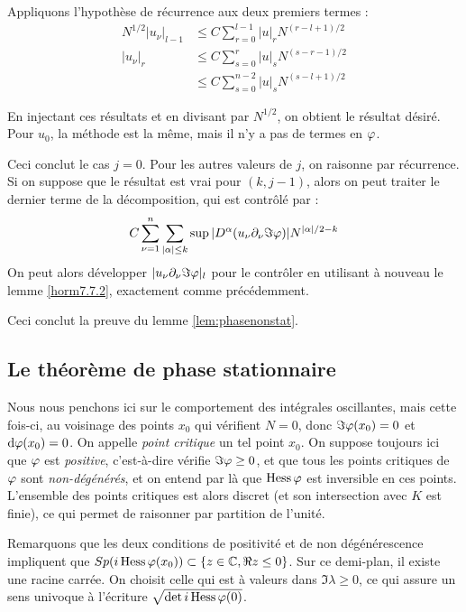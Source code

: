 \noindent Appliquons l'hypothèse de récurrence aux deux premiers termes :
\begin{align*}
N^{1/2}|u_{\nu}|_{l-1} &\leq C \sum_{r=0}^{l-1} |u|_r N^{(r-l+1)/2}\\
|u_{\nu}|_r & \leq C\sum_{s=0}^{r}|u|_sN^{(s-r-1)/2}\\
  &\leq C\sum_{s=0}^{n-2}|u|_sN^{(s-l+1)/2}
\end{align*}

\noindent En injectant ces résultats et en divisant par $N^{1/2}$, on obtient le résultat désiré. Pour $u_0$, la méthode est la même, mais il n'y a pas de termes en $\varphi$.

Ceci conclut le cas $j=0$. Pour les autres valeurs de $j$, on raisonne par récurrence. Si on suppose que le résultat est vrai pour $(k,j-1)$, alors on peut traiter le dernier terme de la décomposition, qui est contrôlé par :
\begin{equation*}
  C \sum_{\nu=1}^{n} \sum_{|\alpha| \leq
    k}\sup|D^{\alpha}(u_{\nu}\partial_{\nu}\Im \varphi)| N^{|\alpha|/2-k}
\end{equation*}
\noindent On peut alors développer $|u_{\nu}\partial_{\nu}\Im \varphi|_l$ pour le contrôler en utilisant à nouveau le lemme \ref{horm7.7.2}, exactement comme précédemment.

Ceci conclut la preuve du lemme \ref{lem:phasenonstat}.

\subsection{Le théorème de phase stationnaire}

Nous nous penchons ici sur le comportement des intégrales oscillantes,
mais cette fois-ci, au voisinage des points $x_0$ qui vérifient $N=0$,
donc $\Im \varphi(x_0) = 0$ et $\mathrm{d}\varphi(x_0)=0$. On appelle \emph{point
  critique} un tel point $x_0$. On suppose toujours ici que $\varphi$ est
\emph{positive}, c'est-à-dire vérifie $\Im \varphi \geq 0$, et que tous
les points critiques de $\varphi$ sont \emph{non-dégénérés}, et on entend
par là que $\operatorname{Hess} \varphi$ est inversible en ces points.
L'ensemble des points critiques est alors discret (et son intersection avec $K$ est finie), ce qui permet de raisonner par partition de l'unité.

Remarquons que les deux conditions de positivité et de non dégénérescence impliquent que  $Sp(i\operatorname{Hess}\varphi(x_0)) \subset \{z \in \mathbb{C}, \Re z \leq 0\}$. Sur ce demi-plan, il existe une racine carrée. On choisit celle qui est à valeurs dans $\Im \lambda \geq 0$, ce qui assure un sens univoque à l'écriture $\sqrt{\det i\operatorname{Hess} \varphi (0)}$.

